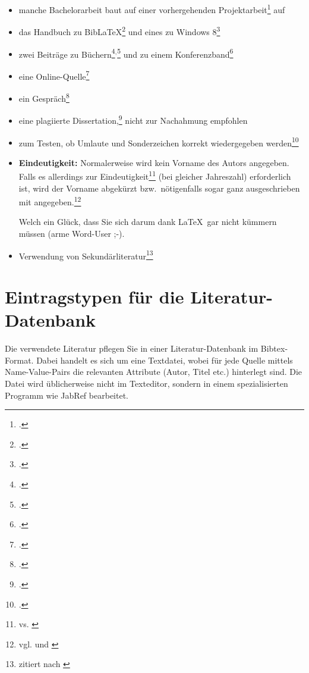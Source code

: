 \begin{itemize}
\item manche Bachelorarbeit baut auf einer vorhergehenden Projektarbeit\footcite{mayer:PA1} auf
\item das Handbuch zu BibLaTeX\footcite{biblatex:manual} und eines zu Windows 8\footcite{Win8}
\item zwei Beiträge zu Büchern\footcite{Trautwein:Nokia}${}^{,}$\footcite{Mann} und zu einem Konferenzband\footcite{Trautwein:Erfolgsfaktoren}
\item eine Online-Quelle\footcite{SAP:HANA}
\item ein Gespräch\footcite{Mueller:Gespraech}
\item eine plagiierte Dissertation,\footcite{GuttenPlag} nicht zur Nachahmung empfohlen
\item zum Testen, ob Umlaute und Sonderzeichen korrekt wiedergegeben werden\footcite{Umlauttest}
\item \textbf{Eindeutigkeit:} Normalerweise wird kein Vorname des Autors angegeben. Falls es allerdings zur Eindeutigkeit\footnote{\cite{trautwein2011unternehmensplanspiele} vs. \cite{hitzler2011optimierung}} (bei gleicher Jahreszahl) erforderlich ist, wird der Vorname abgekürzt bzw.\ nötigenfalls sogar ganz ausgeschrieben mit angegeben.\footnote{vgl. \cite{mayer:PA1} und \cite{mayerLukas:PA1}}
 
Welch ein Glück, dass Sie sich darum dank \LaTeX\ gar nicht kümmern müssen (arme Word\texttrademark-User ;-).

\item Verwendung von Sekundärliteratur\footnote{\cite{Primaerquelle} zitiert nach \cite{Sekundaerquelle}}
\end{itemize}


\section{Eintragstypen für die Literatur-Datenbank}

Die verwendete Literatur pflegen Sie in einer Literatur-Datenbank im Bibtex-Format. Dabei handelt es sich um eine Textdatei, wobei für jede Quelle mittels Name-Value-Pairs die relevanten Attribute (Autor, Titel etc.) hinterlegt sind. Die Datei wird üblicherweise nicht im Texteditor, sondern in einem spezialisierten Programm wie JabRef bearbeitet.

